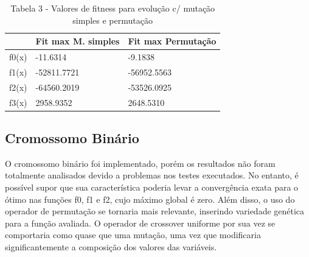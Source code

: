 \documentclass[conference]{IEEEtran}
\begin{document}
\begin{table}[]
\begin{tabular}{|l|l|l|}
\hline
      & Fit max M. simples  & Fit max Permutação  \\ \hline
f0(x) & -11.6314            & -9.1838             \\ \hline
f1(x) & -52811.7721         & -56952.5563         \\ \hline
f2(x) & -64560.2019         & -53526.0925         \\ \hline
f3(x) & 2958.9352           & 2648.5310           \\ \hline
\end{tabular}
\caption*{Tabela 3 - Valores de fitness para evolução c/ mutação simples e permutação}
\end{table}


\subsection{Cromossomo Binário}
O cromossomo binário foi implementado, porém os resultados não foram totalmente 
analisados devido a problemas nos testes executados. 
No entanto, é possível supor que sua característica poderia levar a convergência
exata para o ótimo nas funções f0, f1 e f2, cujo máximo global é zero.
Além disso, o uso do operador de permutação se tornaria mais relevante,
inserindo variedade genética para a função avaliada.
O operador de crossover uniforme por sua vez se comportaria como quase que uma 
mutação, uma vez que modificaria significantemente a composição dos valores das 
variáveis.

%
%
\end{document}

